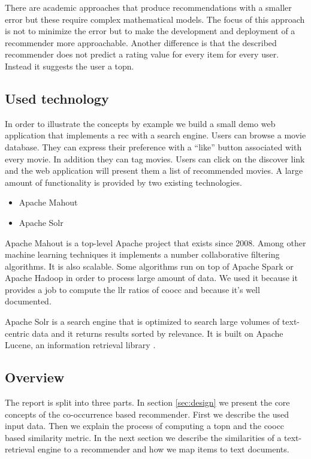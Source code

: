 There are academic approaches that produce recommendations with a smaller error but these require complex mathematical models. The focus of this approach is not to minimize the error but to make the development and deployment of a recommender more approachable. Another difference is that the described recommender does not predict a rating value for every item for every user. Instead it suggests the user a \gls{topn}.


\subsection{Used technology}
\label{sec:tech}

In order to  illustrate the concepts by example we build a small demo web application that implements a \gls{rec} with a search engine. Users can browse a movie database. They can express their preference with a ``like'' button associated with every movie. In addition they can tag movies. Users can click on the discover link and the web application will present them a list of recommended movies. A large amount of functionality is provided by two existing technologies.

\begin{itemize}
\item Apache Mahout
\item Apache Solr
\end{itemize}

Apache Mahout is a top-level Apache project that exists since 2008. Among other machine learning techniques it implements a number collaborative filtering algorithms. It is also \gls{scalable}. Some algorithms run on top of Apache Spark or Apache Hadoop in order to process large amount of data\cite{Owen}. We used it because it provides a job to compute the \gls{llr} ratios of \gls{coocc} and because it's well documented.

Apache Solr is a search engine that is optimized to search large volumes of text-centric data and it returns results sorted by relevance. It is built on Apache Lucene, an information retrieval library \cite{grainger}.

\subsection{Overview}
The report is split into three parts.
In section \ref{sec:design} we present the core concepts of the co-occurrence based recommender. First we describe the used input data. Then we explain the process of computing a \gls{topn} and the \gls{coocc} based similarity metric. In the next section we describe the similarities of a text-retrieval engine to a recommender and how we map items to text documents.

